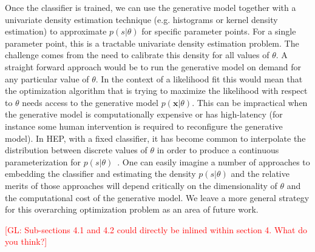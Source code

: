 \documentclass[12pt]{article}
\numberwithin{equation}{section}
\theoremstyle{plain}
\newcommand{\glnote}[1]{\textcolor{red}{[GL: #1]}}
\begin{document}
Once the classifier is trained, we can use the generative model together with a
univariate density estimation technique (e.g. histograms or kernel density
estimation) to approximate $p(s|\theta)$ for specific parameter
points. For a single parameter point, this is a tractable univariate density
estimation problem. The challenge comes from the need to calibrate this density
for all values of $\theta$. A straight forward approach would be to run the
generative model on demand for any particular value of $\theta$. In the context
of a likelihood fit this would mean that the optimization algorithm that is
trying to maximize the likelihood with respect to $\theta$ needs access to the
generative model $p(\mathbf{x}|\theta)$. This can be  impractical when the generative
model is computationally expensive or has high-latency (for instance some human
intervention is required to reconfigure the generative model).  In HEP, with a
fixed classifier, it has become common  to interpolate the distribution between
discrete values of $\theta$ in order to produce a continuous parameterization for
$p(s | \theta)$~\citep{Cranmer:2012sba}.
One can easily imagine a number of approaches to embedding the classifier and
estimating the density $p(s|\theta)$ and the relative merits of those
approaches will depend critically on the dimensionality of $\theta$ and the
computational cost of the generative model. We leave a more general strategy for
this overarching optimization problem as an area of future work.

\glnote{Sub-sections 4.1 and 4.2 could directly be inlined within section 4. What do you think?}



\end{document}
